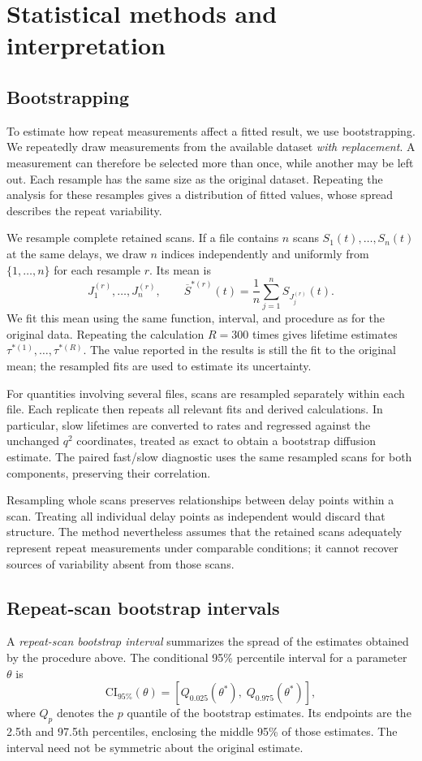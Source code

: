 \clearpage
\section{Statistical methods and interpretation}\label{app:statistics}

\subsection{Bootstrapping}\label{app:bootstrap}
To estimate how repeat measurements affect a fitted result, we use bootstrapping. We repeatedly draw measurements from the available dataset \emph{with replacement}. A measurement can therefore be selected more than once, while another may be left out. Each resample has the same size as the original dataset. Repeating the analysis for these resamples gives a distribution of fitted values, whose spread describes the repeat variability.

We resample complete retained scans. If a file contains $n$ scans $S_1(t),\ldots,S_n(t)$ at the same delays, we draw $n$ indices independently and uniformly from $\{1,\ldots,n\}$ for each resample $r$. Its mean is
\[
J_1^{(r)},\ldots,J_n^{(r)},\qquad
\overline S^{*(r)}(t)=\frac1n\sum_{j=1}^{n}S_{J_j^{(r)}}(t).
\]
We fit this mean using the same function, interval, and procedure as for the original data. Repeating the calculation $R=300$ times gives lifetime estimates $\tau^{*(1)},\ldots,\tau^{*(R)}$. The value reported in the results is still the fit to the original mean; the resampled fits are used to estimate its uncertainty.

For quantities involving several files, scans are resampled separately within each file. Each replicate then repeats all relevant fits and derived calculations. In particular, slow lifetimes are converted to rates and regressed against the unchanged $q^2$ coordinates, treated as exact to obtain a bootstrap diffusion estimate. The paired fast/slow diagnostic uses the same resampled scans for both components, preserving their correlation.

Resampling whole scans preserves relationships between delay points within a scan. Treating all individual delay points as independent would discard that structure. The method nevertheless assumes that the retained scans adequately represent repeat measurements under comparable conditions; it cannot recover sources of variability absent from those scans.

\subsection{Repeat-scan bootstrap intervals}\label{app:bootstrap-intervals}
A \emph{repeat-scan bootstrap interval} summarizes the spread of the estimates obtained by the procedure above. The conditional 95\% percentile interval for a parameter $\theta$ is
\[
\mathrm{CI}_{95\%}(\theta)=
\left[Q_{0.025}(\theta^*),\;Q_{0.975}(\theta^*)\right],
\]
where $Q_p$ denotes the $p$ quantile of the bootstrap estimates. Its endpoints are the 2.5th and 97.5th percentiles, enclosing the middle 95\% of those estimates. The interval need not be symmetric about the original estimate.

